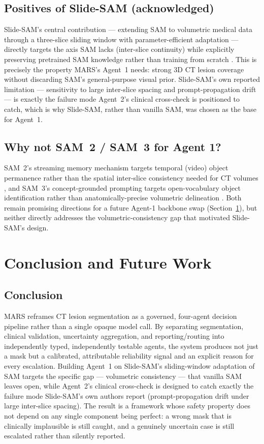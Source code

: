 \documentclass[11pt,a4paper]{article}
\begin{document}
\subsection{Positives of Slide-SAM (acknowledged)}
Slide-SAM's central contribution --- extending SAM to volumetric medical data through a three-slice sliding window with parameter-efficient adaptation --- directly targets the axis SAM lacks (inter-slice continuity) while explicitly preserving pretrained SAM knowledge rather than training from scratch \cite{slidesam}. This is precisely the property MARS's Agent~1 needs: strong 3D CT lesion coverage without discarding SAM's general-purpose visual prior. Slide-SAM's own reported limitation --- sensitivity to large inter-slice spacing and prompt-propagation drift --- is exactly the failure mode Agent~2's clinical cross-check is positioned to catch, which is why Slide-SAM, rather than vanilla SAM, was chosen as the base for Agent~1.

\subsection{Why not SAM~2 / SAM~3 for Agent 1?}
SAM~2's streaming memory mechanism targets temporal (video) object permanence rather than the spatial inter-slice consistency needed for CT volumes \cite{sam2}, and SAM~3's concept-grounded prompting targets open-vocabulary object identification rather than anatomically-precise volumetric delineation \cite{sam3}. Both remain promising directions for a future Agent-1 backbone swap (Section~\ref{sec:conclusion}), but neither directly addresses the volumetric-consistency gap that motivated Slide-SAM's design.

\section{Conclusion and Future Work}
\label{sec:conclusion}

\subsection{Conclusion}
MARS reframes CT lesion segmentation as a governed, four-agent decision pipeline rather than a single opaque model call. By separating segmentation, clinical validation, uncertainty aggregation, and reporting/routing into independently typed, independently testable agents, the system produces not just a mask but a calibrated, attributable reliability signal and an explicit reason for every escalation. Building Agent~1 on Slide-SAM's sliding-window adaptation of SAM targets the specific gap --- volumetric consistency --- that vanilla SAM leaves open, while Agent~2's clinical cross-check is designed to catch exactly the failure mode Slide-SAM's own authors report (prompt-propagation drift under large inter-slice spacing). The result is a framework whose safety property does not depend on any single component being perfect: a wrong mask that is clinically implausible is still caught, and a genuinely uncertain case is still escalated rather than silently reported.
\end{document}

